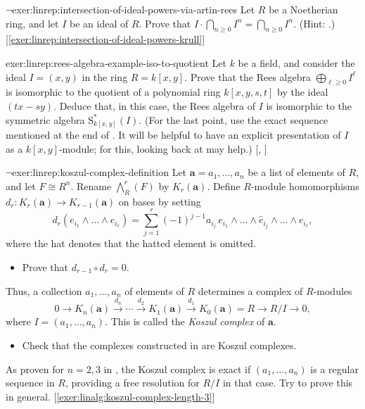 \begin{exer}{$\lnot$}{exer:linrep:intersection-of-ideal-powers-via-artin-rees}
  Let $R$ be a Noetherian ring, and let $I$ be an ideal of $R$. Prove
  that $I \cdot \bigcap_{n \geq 0} I^n = \bigcap_{n \geq 0} I^n$.
  (Hint: .)
  [\ref{exer:linrep:intersection-of-ideal-powers-krull}]
\end{exer}

\begin{exer}{}{exer:linrep:rees-algebra-example-iso-to-quotient}
  Let $k$ be a field, and consider the ideal $I = (x, y)$ in the ring
  $R = k[x, y]$. Prove that the Rees algebra
  $\bigoplus_{\ell \geq 0} I^\ell$ is isomorphic to the quotient of a
  polynomial ring $k[x, y, s, t]$ by the ideal $(tx - sy)$. Deduce
  that, in this case, the Rees algebra of $I$ is isomorphic to the
  symmetric algebra $\mathrm{S}^*_{k[x,y]}(I)$. (For the last point,
  use the exact sequence mentioned at the end of
  . It will be helpful to have
  an explicit presentation of $I$ as a $k[x,y]$-module; for this,
  looking back at  may
  help.) [,
  ]
\end{exer}

\begin{exer}{$\lnot$}{exer:linrep:koszul-complex-definition}
  Let $\mathbf{a} = a_1, \dots, a_n$ be a list of elements of $R$, and
  let $F \cong R^n$. Rename $\bigwedge^r_R(F)$ by $K_r(\mathbf{a})$.
  Define $R$-module homomorphisms
  $d_r : K_r(\mathbf{a}) \to K_{r-1}(\mathbf{a})$ on bases by setting
  \[
    d_r(e_{i_1} \wedge \dots \wedge e_{i_r}) = \sum_{j=1}^r (-1)^{j-1}
    a_{i_j}\, e_{i_1} \wedge \dots \wedge \hat{e}_{i_j} \wedge \dots
    \wedge e_{i_r},
  \]
  where the hat denotes that the hatted element is omitted.
  \begin{itemize}
  \item Prove that $d_{r-1} \circ d_r = 0$.
  \end{itemize}
  Thus, a collection $a_1, \dots, a_n$ of elements of $R$ determines a
  complex of $R$-modules
  \[
    0 \to K_n(\mathbf{a}) \xrightarrow{d_n} \cdots \xrightarrow{d_2}
    K_1(\mathbf{a}) \xrightarrow{d_1} K_0(\mathbf{a}) = R \to R/I \to
    0,
  \]
  where $I = (a_1, \dots, a_n)$. This is called the \emph{Koszul
    complex} of $\mathbf{a}$.
  \begin{itemize}
  \item Check that the complexes constructed in
    are Koszul complexes.
  \end{itemize}
  As proven for $n = 2, 3$ in
  ,
  the
  Koszul complex is exact if $(a_1, \dots, a_n)$ is a regular sequence
  in $R$, providing a free resolution for $R/I$ in that case. Try to
  prove this in general. [\ref{exer:linalg:koszul-complex-length-3}]
\end{exer}

